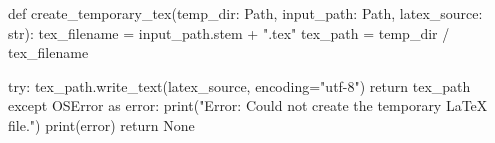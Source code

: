 def create_temporary_tex(temp_dir: Path, input_path: Path, latex_source: str):
    tex_filename = input_path.stem + ".tex"
    tex_path = temp_dir / tex_filename

    try:
        tex_path.write_text(latex_source, encoding="utf-8")
        return tex_path
    except OSError as error:
        print("Error: Could not create the temporary LaTeX file.")
        print(error)
        return None